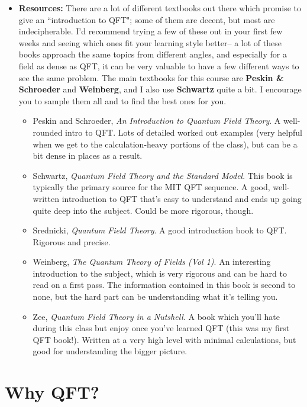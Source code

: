 \documentclass[12pt]{article}
\theoremstyle{mytheorem}
\begin{document}
\begin{itemize}
\item \textbf{Resources:} There are a lot of different textbooks out there which promise to give an ``introduction to QFT"; some of them are decent, but most are indecipherable. I'd recommend trying a few of these out in your first few weeks and seeing which ones fit your learning style better-- a lot of these books approach the same topics from different angles, and especially for a field as dense as QFT, it can be very valuable to have a few different ways to see the same problem. The main textbooks for this course are \textbf{Peskin \& Schroeder} and \textbf{Weinberg}, and I also use \textbf{Schwartz} quite a bit. I encourage you to sample them all and to find the best ones for you.
\begin{itemize}
	\item Peskin and Schroeder, \textit{An Introduction to Quantum Field Theory}. A well-rounded intro to QFT. Lots of detailed worked out examples (very helpful when we get to the calculation-heavy portions of the class), but can be a bit dense in places as a result.
	\item Schwartz, \textit{Quantum Field Theory and the Standard Model}. This book is typically the primary source for the MIT QFT sequence. A good, well-written introduction to QFT that's easy to understand and ends up going quite deep into the subject. Could be more rigorous, though.
	\item Srednicki, \textit{Quantum Field Theory}. A good introduction book to QFT. Rigorous and precise. 
	\item Weinberg, \textit{The Quantum Theory of Fields (Vol 1)}. An interesting introduction to the subject, which is very rigorous and can be hard to read on a first pass. The information contained in this book is second to none, but the hard part can be understanding what it's telling you. 
	\item Zee, \textit{Quantum Field Theory in a Nutshell}. A book which you'll hate during this class but enjoy once you've learned QFT (this was my first QFT book!). Written at a very high level with minimal calculations, but good for understanding the bigger picture. 
\end{itemize}

\end{itemize}

\section*{Why QFT?}
\end{document}
